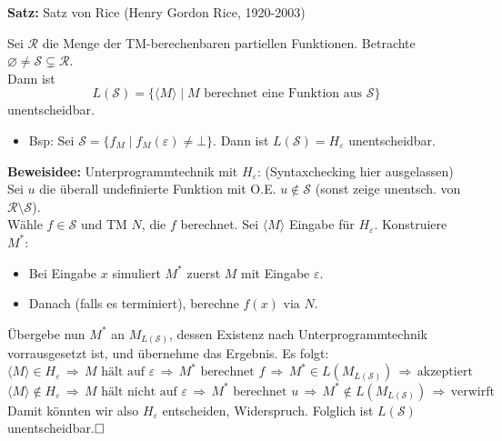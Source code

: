 \documentclass[a4paper,graphics,11pt]{article}
\newcommand{\eps}[0]{\varepsilon}
\newcommand{\godel}[1]{\langle #1 \rangle}
\begin{document}
\newpage

\textbf{Satz:} Satz von Rice (Henry Gordon Rice, 1920-2003)

Sei $\mathcal{R}$ die Menge der TM-berechenbaren partiellen Funktionen.
Betrachte $\varnothing \neq \mathcal{S} \subsetneq \mathcal{R}$.\\
Dann ist
$$
    L(\mathcal{S}) = \{\langle M \rangle \mid M \text{ berechnet eine Funktion aus } \mathcal{S}\}
$$
unentscheidbar.
\begin{itemize}
    \item Bsp: Sei $\mathcal{S} = \{f_M \mid f_M(\eps) \neq \bot\}$.
        Dann ist $L(\mathcal{S}) = H_\eps$ unentscheidbar.
\end{itemize}
\textbf{Beweisidee:} Unterprogrammtechnik mit $H_\eps$: (Syntaxchecking hier ausgelassen)\\
Sei $u$ die überall undefinierte Funktion mit O.E. $u \notin \mathcal{S}$
(sonst zeige unentsch. von $\mathcal{R} \setminus \mathcal{S}$).\\
Wähle $f \in \mathcal{S}$ und TM $N$, die $f$ berechnet.
Sei $\godel{M}$ Eingabe für $H_\eps$. Konstruiere $M^*$:
\begin{itemize}
    \item Bei Eingabe $x$ simuliert $M^*$ zuerst $M$ mit Eingabe $\eps$.
    \item Danach (falls es terminiert), berechne $f(x)$ via $N$.
\end{itemize}
Übergebe nun $M^*$ an $M_{L(\mathcal{S})}$, dessen Existenz nach Unterprogrammtechnik vorrausgesetzt ist,
und übernehme das Ergebnis.
Es folgt:
$$
    \godel{M} \in H_\eps
    \,\Longrightarrow\, \text{$M$ hält auf $\eps$}
    \,\Longrightarrow\, \text{$M^*$ berechnet $f$}
    \,\Longrightarrow\, M^* \in L(M_{L(\mathcal{S})})
    \,\Longrightarrow\, \text{akzeptiert}
$$
$$
    \godel{M} \notin H_\eps
    \,\Longrightarrow\, \text{$M$ hält nicht auf $\eps$}
    \,\Longrightarrow\, \text{$M^*$ berechnet $u$}
    \,\Longrightarrow\, M^* \notin L(M_{L(\mathcal{S})})
    \,\Longrightarrow\, \text{verwirft}
$$
Damit könnten wir also $H_\eps$ entscheiden, Widerspruch. Folglich ist $L(\mathcal{S})$ unentscheidbar.$\hfill\square$
\\
\end{document}
